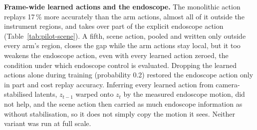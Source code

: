\documentclass[journal]{IEEEtran}
\begin{document}
\begin{table}[h]
\centering
\caption{Pilots: the objective of the learned actions (step 12k, the same 256 validation windows). Increase: rise of the replay error when the learned or the endoscope action of another window is used.}
\label{tab:pilot-objective}
\end{table}

\textbf{Frame-wide learned actions and the endoscope.} The monolithic action replays 17\,\% more accurately than the arm actions, almost all of it outside the instrument regions, and takes over part of the explicit endoscope action (Table~\ref{tab:pilot-scene}). A fifth, scene action, pooled and written only outside every arm's region, closes the gap while the arm actions stay local, but it too weakens the endoscope action, even with every learned action zeroed, the condition under which endoscope control is evaluated. Dropping the learned actions alone during training (probability 0.2) restored the endoscope action only in part and cost replay accuracy. Inferring every learned action from camera-stabilised latents, $z_{t-1}$ warped onto $z_t$ by the measured endoscope motion, did not help, and the scene action then carried as much endoscope information as without stabilisation, so it does not simply copy the motion it sees. Neither variant was run at full scale.
\end{document}

